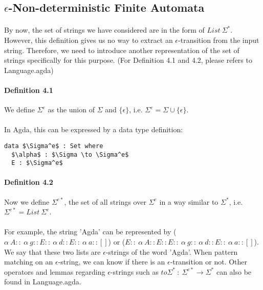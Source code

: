 \subsection{\(\epsilon\)-Non-deterministic Finite Automata}

\paragraph{} By now, the set of strings we have considered are in the form of
\(List\ \Sigma^*\). However, this definition gives us no way to
extract an \(\epsilon\)-transition from the input string. Therefore, we need to introduce another
representation of the set of strings specifically for this purpose. (For Definition 4.1 and
4.2, please refers to Language.agda)

\paragraph{Definition 4.1} We define \(\Sigma^e\) as the union of
\(\Sigma\) and \(\{\epsilon\}\), i.e. \(\Sigma^e = \Sigma \cup
\{\epsilon\}\). 

\paragraph{} In Agda, this can be expressed by a data type definition:
\begin{lstlisting}[mathescape=true,xleftmargin=.4\textwidth,aboveskip=0pt,belowskip=0pt]
data $\Sigma^e$ : Set where
  $\alpha$ : $\Sigma \to \Sigma^e$
  E : $\Sigma^e$
\end{lstlisting}

\paragraph{Definition 4.2} Now we define \(\Sigma^{e*}\), the set of all strings over
\(\Sigma^e\) in a way similar to \(\Sigma^*\), i.e. \(\Sigma^{e*} =
List\ \Sigma^e\). 

\paragraph{} For example, the string 'Agda' can be
represented by (\(\alpha\ A ::\ \alpha\ g :: E ::\ \alpha\ d :: E ::\ \alpha\
a :: []\)) or (\(E ::\ \alpha\ A :: E :: E ::\ \alpha\ g ::\ \alpha\ d :: E ::\ \alpha\
a :: []\)). We say that these two lists are
\(\epsilon\)-strings of the word 'Agda'. When pattern matching on an \(\epsilon\)-string, we
can know if there is an \(\epsilon\)-transition or not. Other operators and lemmas
regarding \(\epsilon\)-strings such
as \(to\Sigma^*\ :\ \Sigma^{e*} \to \Sigma^*\) can also be found in
Language.agda. 

